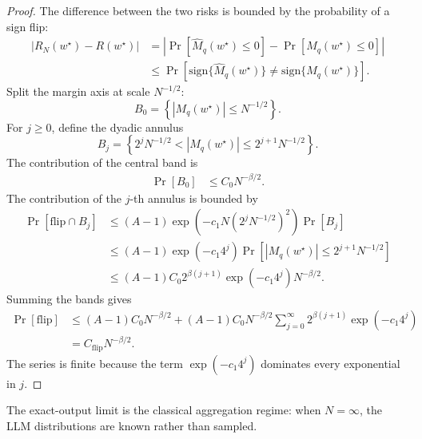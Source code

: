 \documentclass{article} %
\providecommand{\Risk}{R}
\providecommand{\Mhat}{\widehat{M}}
\providecommand{\wstar}{w^{\star}}
\begin{document}
\begin{proof}
The difference between the two risks is bounded by the probability of a sign flip:
\begin{align}
\left|
R_N(\wstar)-\Risk(\wstar)
\right|
&=
\left|
\Pr[\Mhat_q(\wstar)\le 0]
-
\Pr[M_q(\wstar)\le 0]
\right|
\label{eq:app4-integrated-proof-a}
\\
&\le
\Pr\!\left[
\mathrm{sign}\{\Mhat_q(\wstar)\}
\ne
\mathrm{sign}\{M_q(\wstar)\}
\right].
\label{eq:app4-integrated-proof-b}
\end{align}
Split the margin axis at scale \(N^{-1/2}\):
\begin{equation}
\label{eq:app4-band0}
B_0
=
\left\{
|M_q(\wstar)|\le N^{-1/2}
\right\}.
\end{equation}
For \(j\ge 0\), define the dyadic annulus
\begin{equation}
\label{eq:app4-bandj}
B_j
=
\left\{
2^jN^{-1/2}
<
|M_q(\wstar)|
\le
2^{j+1}N^{-1/2}
\right\}.
\end{equation}
The contribution of the central band is
\begin{align}
\Pr[B_0]
&\le
C_0N^{-\beta/2}.
\label{eq:app4-integrated-proof-c}
\end{align}
The contribution of the \(j\)-th annulus is bounded by
\begin{align}
\Pr[\mathrm{flip}\cap B_j]
&\le
(A-1)
\exp\!\left(
-c_1N(2^jN^{-1/2})^2
\right)
\Pr[B_j]
\label{eq:app4-integrated-proof-d}
\\
&\le
(A-1)
\exp\!\left(
-c_1 4^j
\right)
\Pr\!\left[
|M_q(\wstar)|
\le
2^{j+1}N^{-1/2}
\right]
\label{eq:app4-integrated-proof-e}
\\
&\le
(A-1)
C_0
2^{\beta(j+1)}
\exp\!\left(
-c_1 4^j
\right)
N^{-\beta/2}.
\label{eq:app4-integrated-proof-f}
\end{align}
Summing the bands gives
\begin{align}
\Pr[\mathrm{flip}]
&\le
(A-1)C_0N^{-\beta/2}
+
(A-1)C_0N^{-\beta/2}
\sum_{j=0}^{\infty}
2^{\beta(j+1)}
\exp\!\left(-c_1 4^j\right)
\label{eq:app4-integrated-proof-g}
\\
&=
C_{\mathrm{flip}}N^{-\beta/2}.
\label{eq:app4-integrated-proof-h}
\end{align}
The series is finite because the term \(\exp(-c_1 4^j)\) dominates every exponential in \(j\).
\end{proof}

The exact-output limit is the classical aggregation regime: when \(N=\infty\), the LLM distributions are known rather than sampled.
\end{document}
